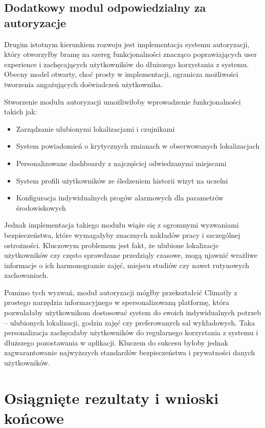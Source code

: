 \documentclass[a4paper,12pt,openany]{book}
\begin{document}
\subsection*{Dodatkowy modul odpowiedzialny za autoryzacje}

Drugim istotnym kierunkiem rozwoju jest implementacja systemu autoryzacji, który otworzyłby bramę na szereg funkcjonalności znacząco poprawiających user experience i zachęcających użytkowników do dłuższego korzystania z systemu. Obecny model otwarty, choć prosty w implementacji, ogranicza możliwości tworzenia angażujących doświadczeń użytkownika.

Stworzenie modułu autoryzacji umożliwiłoby wprowadzenie funkcjonalności takich jak:
\begin{itemize}
   \item Zarządzanie ulubionymi lokalizacjami i czujnikami
   \item System powiadomień o krytycznych zmianach w obserwowanych lokalizacjach
   \item Personalizowane dashboardy z najczęściej odwiedzanymi miejscami
   \item System profili użytkowników ze śledzeniem historii wizyt na uczelni
   \item Konfiguracja indywidualnych progów alarmowych dla parametrów środowiskowych
\end{itemize}

Jednak implementacja takiego modułu wiąże się z ogromnymi wyzwaniami bezpieczeństwa, które wymagałyby znacznych nakładów pracy i szczególnej ostrożności. Kluczowym problemem jest fakt, że ulubione lokalizacje użytkowników czy często sprawdzane przedziąly czasowe, mogą ujawnić wrażliwe informacje o ich harmonogramie zajęć, miejscu studiów czy nawet rutynowych zachowaniach.

Pomimo tych wyzwań, moduł autoryzacji mógłby przekształcić Climatly z prostego narzędzia informacyjnego w spersonalizowaną platformę, która pozwalałaby użytkownikom dostosować system do swoich indywidualnych potrzeb -- ulubionych lokalizacji, godzin zajęć czy preferowanych sal wykładowych. Taka personalizacja zachęcałaby użytkowników do regularnego korzystania z systemu i dłuższego pozostawania w aplikacji. Kluczem do sukcesu byłoby jednak zagwarantowanie najwyższych standardów bezpieczeństwa i prywatności danych użytkowników.

\section{Osiągnięte rezultaty i wnioski końcowe}
\end{document}
